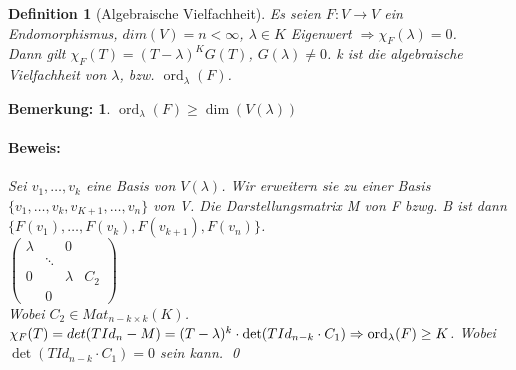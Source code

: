\documentclass{report}
\newcommand{\lb}{\lambda}
\DeclareMathOperator{\ord}{ord}
\theoremstyle{customrem}
\newtheorem*{bemerkung}{Bemerkung\textnormal:}
\theoremstyle{customdef}
\newtheorem{definition}{Definition}[chapter]
\renewenvironment{proof}{\paragraph{Beweis: }}{\qed}
\theoremstyle{customenv}
\begin{document}
\begin{definition}[Algebraische Vielfachheit]
  Es seien \(F : V \to V\) ein Endomorphismus, \(dim(V) = n < \infty\),
  \(\lb \in K\) Eigenwert \(\Rightarrow \chi_F(\lb) = 0\).\\
  Dann gilt  \(\chi_F(T) = (T-\lb)^K G(T)\), \(G(\lb) \neq 0\). k ist die
  algebraische Vielfachheit von \(\lb\), bzw. \(\ord_\lb(F)\).
\end{definition}

\begin{bemerkung}
  \(\ord_\lb(F) \ge \dim(V(\lb))\)\\
  \begin{proof}
    Sei \({v_1, \dots, v_k}\) eine Basis von \(V(\lb)\). Wir erweitern sie zu
    einer Basis \(\{v_1, \dots, v_k, v_{K+1}, \dots, v_n\}\) von V. Die
    Darstellungsmatrix M von F bzwg. B ist dann\\
    \(\{F(v_1), \dots, F(v_k), F(v_{k+1}), F(v_n)\}\).\\
    \(
      \begin{pmatrix}
        \lb &        & 0         & \\
            & \ddots &           & \\
        0   &        &  \lambda  & C_2 \\
            & 0  
      \end{pmatrix}
    \)\\
    Wobei \(C_2 \in Mat_{n-k \times k}(K)\).\\
    \(
      \chi_F(T) = det(T Id_n - M)
      = (T - \lb)^k \cdot \det(T Id_{n-k} \cdot C_1)\\
      \Rightarrow \ord_\lb(F) \ge K
    \). Wobei \(\det(T Id_{n-k} \cdot C_1) = 0\) sein kann.
  \end{proof}
\end{bemerkung}
\end{document}
